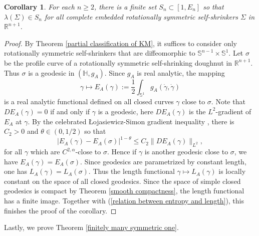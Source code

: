 \documentclass[12pt]{amsart}
\numberwithin{equation}{section}
\newtheorem{cor}[thm]{Corollary}
\theoremstyle{remark}
\begin{document}
	\begin{cor} \label{finiteness of entropy value}
		For each $n\ge 2$, there is a finite set $S_n \subset [1,E_n]$ so that $\lambda (\Sigma) \in S_n$ for all complete embedded rotationally symmetric self-shrinkers $\Sigma$ in $\mathbb R^{n+1}$.
	\end{cor}
	
	\begin{proof}
		By Theorem \ref{partial classification of KM}, it suffices to consider only rotationally symmetric self-shrinkers that are diffeomorphic to $\mathbb S^{n-1} \times\mathbb S^1$. Let $\sigma$ be the profile curve of a rotationally symmetric self-shrinking doughnut in $\mathbb R^{n+1}$. Thus $\sigma$ is a geodesic in $(\mathbb H, g_A)$. Since $g_A$ is real analytic, the mapping 
		$$\gamma \mapsto E_A(\gamma):= \frac 12\int_{\mathbb S^1} g_A(\dot\gamma, \dot\gamma)$$
		is a real analytic functional defined on all closed curves $\gamma$ close to $\sigma$. Note that $DE_A(\gamma)=0$ if and only if $\gamma$ is a geodesic, here $DE_A(\gamma)$ is the $L^2$-gradient of $E_A$ at $\gamma$. By the celebrated \L ojasiewicz-Simon gradient inequality \cite[equation (2.2)]{Leonsimon}, there is $C_2 >0$ and $\theta \in (0,1/2)$ so that 
		$$| E_A(\gamma) - E_A(\sigma)|^{1-\theta} \le C_2 \| DE_A(\gamma)\|_{L^2},$$
		for all $\gamma$ which are $C^{2,\alpha}$-close to $\sigma$. Hence if $\gamma$ is another geodesic close to $\sigma$, we have $E_A(\gamma) = E_A(\sigma)$. Since geodesics are parametrized by constant length, one has $L_A(\gamma) = L_A(\sigma)$. Thus the length functional $\gamma \mapsto L_A(\gamma)$ is locally constant on the space of all closed geodesics. Since the space of simple closed geodesics is compact by Theorem \ref{smooth compactness}, the length functional has a finite image. Together with (\ref{relation between entropy and length}), this finishes the proof of the corollary. 
	\end{proof}
	
	Lastly, we prove Theorem \ref{finitely many symmetric one}.
	
\end{document}
